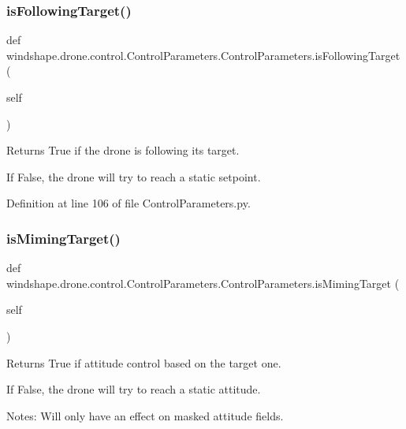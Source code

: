 \subsubsection{\texorpdfstring{is\+Following\+Target()}{isFollowingTarget()}}
{\footnotesize\ttfamily def windshape.\+drone.\+control.\+Control\+Parameters.\+Control\+Parameters.\+is\+Following\+Target (\begin{DoxyParamCaption}\item[{}]{self }\end{DoxyParamCaption})}

\begin{DoxyVerb}Returns True if the drone is following its target.

If False, the drone will try to reach a static setpoint.
\end{DoxyVerb}
 

Definition at line 106 of file Control\+Parameters.\+py.

\mbox{\label{classwindshape_1_1drone_1_1control_1_1_control_parameters_1_1_control_parameters_a5c55403f152d45380fadd7b2fbabb998}} 
\subsubsection{\texorpdfstring{is\+Miming\+Target()}{isMimingTarget()}}
{\footnotesize\ttfamily def windshape.\+drone.\+control.\+Control\+Parameters.\+Control\+Parameters.\+is\+Miming\+Target (\begin{DoxyParamCaption}\item[{}]{self }\end{DoxyParamCaption})}

\begin{DoxyVerb}Returns True if attitude control based on the target one.

If False, the drone will try to reach a static attitude.

Notes:
    Will only have an effect on masked attitude fields.
\end{DoxyVerb}
 

